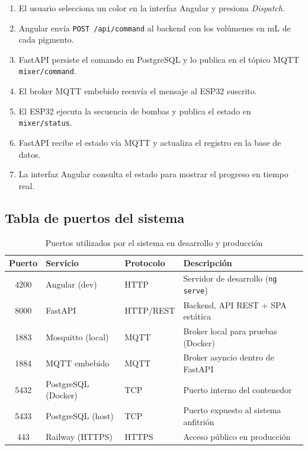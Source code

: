\documentclass[conference]{IEEEtran}
\begin{document}
\begin{enumerate}
    \item El usuario selecciona un color en la interfaz Angular y presiona \textit{Dispatch}.
    \item Angular env\'ia \texttt{POST /api/command} al backend con los vol\'umenes en mL de cada pigmento.
    \item FastAPI persiste el comando en PostgreSQL y lo publica en el t\'opico MQTT \texttt{mixer/command}.
    \item El broker MQTT embebido reenv\'ia el mensaje al ESP32 suscrito.
    \item El ESP32 ejecuta la secuencia de bombas y publica el estado en \texttt{mixer/status}.
    \item FastAPI recibe el estado v\'ia MQTT y actualiza el registro en la base de datos.
    \item La interfaz Angular consulta el estado para mostrar el progreso en tiempo real.
\end{enumerate}

\subsection{Tabla de puertos del sistema}

\begin{table}[H]
\centering
\caption{Puertos utilizados por el sistema en desarrollo y producci\'on}
\label{tab:puertos}
\renewcommand{\arraystretch}{1.4}
\begin{tabular}{|c|l|l|p{3.0cm}|}
\hline
\textbf{Puerto} & \textbf{Servicio} & \textbf{Protocolo} & \textbf{Descripci\'on} \\
\hline
4200  & Angular (dev)         & HTTP      & Servidor de desarrollo (\texttt{ng serve}) \\
\hline
8000  & FastAPI               & HTTP/REST & Backend, API REST + SPA est\'atica \\
\hline
1883  & Mosquitto (local)     & MQTT      & Broker local para pruebas (Docker) \\
\hline
1884  & MQTT embebido         & MQTT      & Broker asyncio dentro de FastAPI \\
\hline
5432  & PostgreSQL (Docker)   & TCP       & Puerto interno del contenedor \\
\hline
5433  & PostgreSQL (host)     & TCP       & Puerto expuesto al sistema anfitri\'on \\
\hline
443   & Railway (HTTPS)       & HTTPS     & Acceso p\'ublico en producci\'on \\
\hline
\end{tabular}
\end{table}
\end{document}
